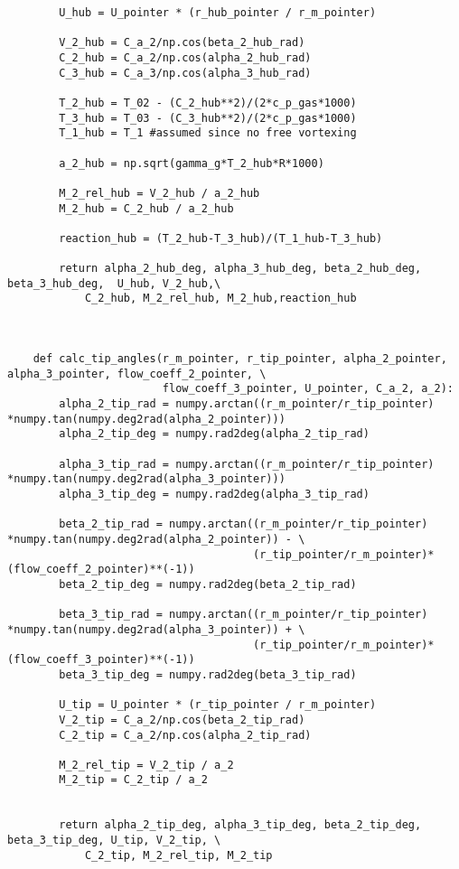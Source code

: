 \begin{verbatim}
        U_hub = U_pointer * (r_hub_pointer / r_m_pointer)

        V_2_hub = C_a_2/np.cos(beta_2_hub_rad)
        C_2_hub = C_a_2/np.cos(alpha_2_hub_rad)
        C_3_hub = C_a_3/np.cos(alpha_3_hub_rad)
        
        T_2_hub = T_02 - (C_2_hub**2)/(2*c_p_gas*1000)
        T_3_hub = T_03 - (C_3_hub**2)/(2*c_p_gas*1000)
        T_1_hub = T_1 #assumed since no free vortexing

        a_2_hub = np.sqrt(gamma_g*T_2_hub*R*1000)

        M_2_rel_hub = V_2_hub / a_2_hub 
        M_2_hub = C_2_hub / a_2_hub

        reaction_hub = (T_2_hub-T_3_hub)/(T_1_hub-T_3_hub)

        return alpha_2_hub_deg, alpha_3_hub_deg, beta_2_hub_deg, beta_3_hub_deg,  U_hub, V_2_hub,\
            C_2_hub, M_2_rel_hub, M_2_hub,reaction_hub
    
    

    def calc_tip_angles(r_m_pointer, r_tip_pointer, alpha_2_pointer, alpha_3_pointer, flow_coeff_2_pointer, \
                        flow_coeff_3_pointer, U_pointer, C_a_2, a_2):
        alpha_2_tip_rad = numpy.arctan((r_m_pointer/r_tip_pointer) *numpy.tan(numpy.deg2rad(alpha_2_pointer)))
        alpha_2_tip_deg = numpy.rad2deg(alpha_2_tip_rad)
    
        alpha_3_tip_rad = numpy.arctan((r_m_pointer/r_tip_pointer) *numpy.tan(numpy.deg2rad(alpha_3_pointer)))
        alpha_3_tip_deg = numpy.rad2deg(alpha_3_tip_rad)
    
        beta_2_tip_rad = numpy.arctan((r_m_pointer/r_tip_pointer) *numpy.tan(numpy.deg2rad(alpha_2_pointer)) - \
                                      (r_tip_pointer/r_m_pointer)*(flow_coeff_2_pointer)**(-1))
        beta_2_tip_deg = numpy.rad2deg(beta_2_tip_rad)
    
        beta_3_tip_rad = numpy.arctan((r_m_pointer/r_tip_pointer) *numpy.tan(numpy.deg2rad(alpha_3_pointer)) + \
                                      (r_tip_pointer/r_m_pointer)*(flow_coeff_3_pointer)**(-1))
        beta_3_tip_deg = numpy.rad2deg(beta_3_tip_rad)    

        U_tip = U_pointer * (r_tip_pointer / r_m_pointer)
        V_2_tip = C_a_2/np.cos(beta_2_tip_rad)
        C_2_tip = C_a_2/np.cos(alpha_2_tip_rad)

        M_2_rel_tip = V_2_tip / a_2
        M_2_tip = C_2_tip / a_2


        return alpha_2_tip_deg, alpha_3_tip_deg, beta_2_tip_deg, beta_3_tip_deg, U_tip, V_2_tip, \
            C_2_tip, M_2_rel_tip, M_2_tip
    


\end{verbatim}
